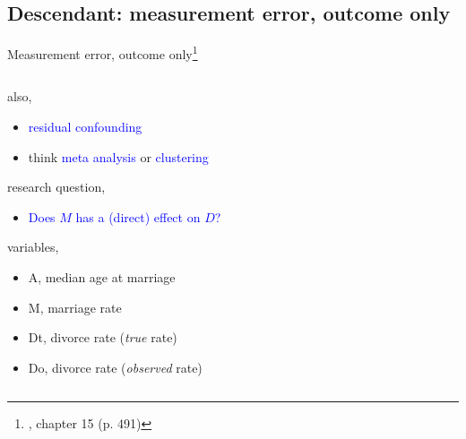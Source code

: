 \subsection{Descendant: measurement error, outcome only}
%
%
\begin{frame}[t, negative]
	\subsectionpage
\end{frame}
%
%
\begin{frame}
	{Measurement error, outcome only\footnote{\citet{McElreath_2020}, chapter 15 (p. 491)}}
	\begin{columns}
		\begin{column}{0.5\textwidth}
			also, 
			\begin{itemize}
				\item \textcolor{blue}{residual confounding}
				\item think \textcolor{blue}{meta analysis} or \textcolor{blue}{clustering}
			\end{itemize}
			
			research question, 
			\begin{itemize}
				\item \textcolor{blue}{Does $M$ has a (direct) effect on $D$?}
			\end{itemize}
			
			variables,
			\begin{itemize}
				\item A, median age at marriage
				\item M, marriage rate
				\item Dt, divorce rate (\textit{true} rate)
				\item Do, divorce rate (\textit{observed} rate)
			\end{itemize}
			

\end{column}
\end{columns}
\end{frame}
